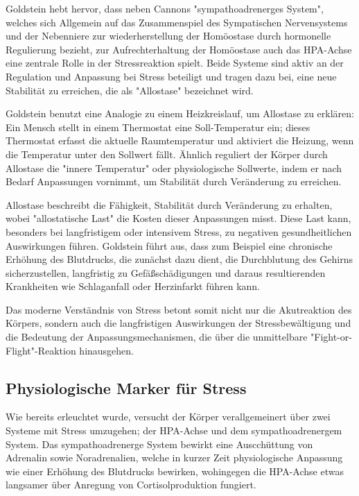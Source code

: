 Goldstein hebt hervor, dass neben Cannons "sympathoadrenerges System", welches sich Allgemein auf das Zusammenspiel des Sympatischen Nervensystems 
und der Nebenniere zur wiederherstellung der Homöostase durch hormonelle Regulierung bezieht, zur Aufrechterhaltung der Homöostase auch das \ac{HPA-Achse}
eine zentrale Rolle in der Stressreaktion spielt. Beide Systeme sind aktiv an der Regulation und Anpassung bei Stress beteiligt und tragen dazu bei, eine 
neue Stabilität zu erreichen, die als "Allostase" bezeichnet wird.

Goldstein benutzt eine Analogie zu einem Heizkreislauf, um Allostase zu erklären: Ein Mensch stellt in einem Thermostat 
eine Soll-Temperatur ein; dieses Thermostat erfasst die aktuelle Raumtemperatur und aktiviert die Heizung, wenn die Temperatur unter den Sollwert fällt. 
Ähnlich reguliert der Körper durch Allostase die "innere Temperatur" oder physiologische Sollwerte, indem er nach Bedarf Anpassungen vornimmt, 
um Stabilität durch Veränderung zu erreichen.

Allostase beschreibt die Fähigkeit, Stabilität durch Veränderung zu erhalten, wobei "allostatische Last" die Kosten dieser Anpassungen misst. 
Diese Last kann, besonders bei langfristigem oder intensivem Stress, zu negativen gesundheitlichen Auswirkungen führen. Goldstein führt aus, 
dass zum Beispiel eine chronische Erhöhung des Blutdrucks, die zunächst dazu dient, die Durchblutung des Gehirns sicherzustellen, langfristig zu 
Gefäßschädigungen und daraus resultierenden Krankheiten wie Schlaganfall oder Herzinfarkt führen kann. \cite{Gold2007}

Das moderne Verständnis von Stress betont somit nicht nur die Akutreaktion des Körpers, sondern auch die langfristigen Auswirkungen der Stressbewältigung 
und die Bedeutung der Anpassungsmechanismen, die über die unmittelbare "Fight-or-Flight"-Reaktion hinausgehen.

\subsection{Physiologische Marker für Stress}

Wie bereits erleuchtet wurde, versucht der Körper verallgemeinert über zwei Systeme mit Stress umzugehen; der \ac{HPA-Achse} und dem sympathoadrenergem System. 
Das sympathoadrenerge System bewirkt eine Auscchüttung von Adrenalin sowie Noradrenalien, welche in kurzer Zeit physiologische Anpassung wie einer Erhöhung des Blutdrucks bewirken,
wohingegen die \ac{HPA-Achse} etwas langsamer über Anregung von Cortisolproduktion fungiert. \cite{Kaiser2023}

